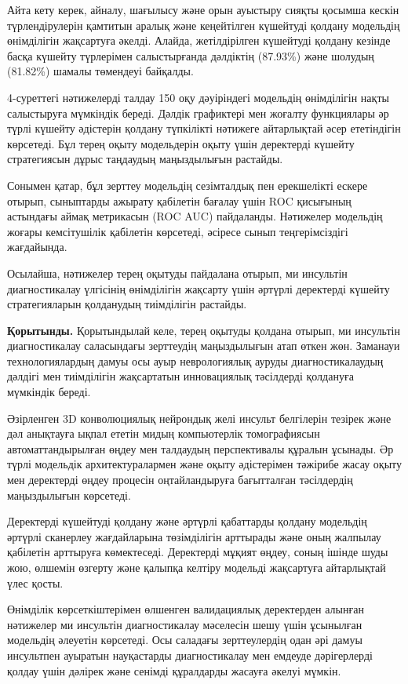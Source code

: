 Айта кету керек, айналу, шағылысу және орын ауыстыру сияқты қосымша
кескін түрлендірулерін қамтитын аралық және кеңейтілген күшейтуді
қолдану модельдің өнімділігін жақсартуға әкелді. Алайда, жетілдірілген
күшейтуді қолдану кезінде басқа күшейту түрлерімен салыстырғанда
дәлдіктің (87.93\%) және шолудың (81.82\%) шамалы төмендеуі байқалды.

4-суреттегі нәтижелерді талдау 150 оқу дәуіріндегі модельдің өнімділігін
нақты салыстыруға мүмкіндік береді. Дәлдік графиктері мен жоғалту
функциялары әр түрлі күшейту әдістерін қолдану түпкілікті нәтижеге
айтарлықтай әсер ететіндігін көрсетеді. Бұл терең оқыту модельдерін
оқыту үшін деректерді күшейту стратегиясын дұрыс таңдаудың маңыздылығын
растайды.

Сонымен қатар, бұл зерттеу модельдің сезімталдық пен ерекшелікті ескере
отырып, сыныптарды ажырату қабілетін бағалау үшін ROC қисығының
астындағы аймақ метрикасын (ROC AUC) пайдаланды. Нәтижелер модельдің
жоғары кемсітушілік қабілетін көрсетеді, әсіресе сынып теңгерімсіздігі
жағдайында.

Осылайша, нәтижелер терең оқытуды пайдалана отырып, ми инсультін
диагностикалау үлгісінің өнімділігін жақсарту үшін әртүрлі деректерді
күшейту стратегияларын қолданудың тиімділігін растайды.

\textbf{Қорытынды.} Қорытындылай келе, терең оқытуды қолдана отырып, ми
инсультін диагностикалау саласындағы зерттеудің маңыздылығын атап өткен
жөн. Заманауи технологиялардың дамуы осы ауыр неврологиялық ауруды
диагностикалаудың дәлдігі мен тиімділігін жақсартатын инновациялық
тәсілдерді қолдануға мүмкіндік береді.

Әзірленген 3D конволюциялық нейрондық желі инсульт белгілерін тезірек
және дәл анықтауға ықпал ететін мидың компьютерлік томографиясын
автоматтандырылған өңдеу мен талдаудың перспективалы құралын ұсынады. Әр
түрлі модельдік архитектуралармен және оқыту әдістерімен тәжірибе жасау
оқыту мен деректерді өңдеу процесін оңтайландыруға бағытталған
тәсілдердің маңыздылығын көрсетеді.

Деректерді күшейтуді қолдану және әртүрлі қабаттарды қолдану модельдің
әртүрлі сканерлеу жағдайларына төзімділігін арттырады және оның жалпылау
қабілетін арттыруға көмектеседі. Деректерді мұқият өңдеу, соның ішінде
шуды жою, өлшемін өзгерту және қалыпқа келтіру модельді жақсартуға
айтарлықтай үлес қосты.

Өнімділік көрсеткіштерімен өлшенген валидациялық деректерден алынған
нәтижелер ми инсультін диагностикалау мәселесін шешу үшін ұсынылған
модельдің әлеуетін көрсетеді. Осы саладағы зерттеулердің одан әрі дамуы
инсультпен ауыратын науқастарды диагностикалау мен емдеуде дәрігерлерді
қолдау үшін дәлірек және сенімді құралдарды жасауға әкелуі мүмкін.

